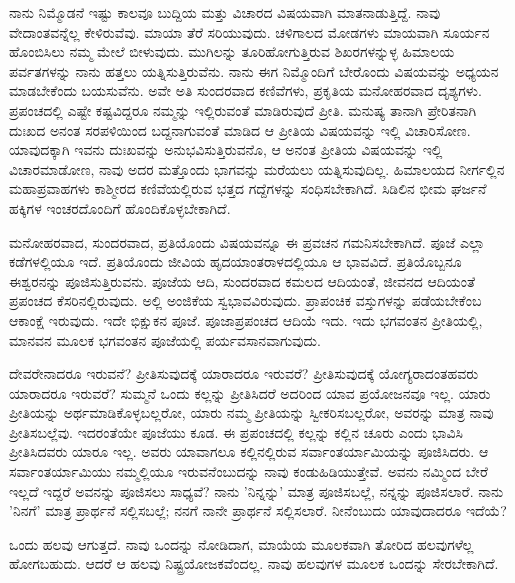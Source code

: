 ನಾನು ನಿಮ್ಮೊಡನೆ ಇಷ್ಟು ಕಾಲವೂ ಬುದ್ದಿಯ ಮತ್ತು ವಿಚಾರದ ವಿಷಯವಾಗಿ ಮಾತನಾಡುತ್ತಿದ್ದೆ. ನಾವು ವೇದಾಂತವನ್ನೆಲ್ಲ ಕೇಳಿರುವೆವು. ಮಾಯಾ ತೆರೆ ಸರಿಯುವುದು. ಚಳಿಗಾಲದ ಮೋಡಗಳು ಮಾಯವಾಗಿ ಸೂರ್ಯನ ಹೊಂಬಿಸಿಲು ನಮ್ಮ ಮೇಲೆ ಬೀಳುವುದು. ಮುಗಿಲನ್ನು ತೂರಿಹೋಗುತ್ತಿರುವ ಶಿಖರಗಳನ್ನುಳ್ಳ ಹಿಮಾಲಯ ಪರ್ವತಗಳನ್ನು ನಾನು ಹತ್ತಲು ಯತ್ನಿಸುತ್ತಿರುವೆನು. ನಾನು ಈಗ ನಿಮ್ಮೊಂದಿಗೆ ಬೇರೊಂದು ವಿಷಯವನ್ನು ಅಧ್ಯಯನ ಮಾಡಬೇಕೆಂದು ಬಯಸುವೆನು. ಅವೇ ಅತಿ ಸುಂದರವಾದ ಕಣಿವೆಗಳು, ಪ್ರಕೃತಿಯ ಮನೋಹರವಾದ ದೃಶ್ಯಗಳು. ಪ್ರಪಂಚದಲ್ಲಿ ಎಷ್ಟೇ ಕಷ್ಟವಿದ್ದರೂ ನಮ್ಮನ್ನು ಇಲ್ಲಿರುವಂತೆ ಮಾಡಿರುವುದೆ ಪ್ರೀತಿ. ಮನುಷ್ಯ ತಾನಾಗಿ ಪ್ರೇರಿತನಾಗಿ ದುಃಖದ ಅನಂತ ಸರಪಳಿಯಿಂದ ಬದ್ದನಾಗುವಂತೆ ಮಾಡಿದ ಆ ಪ್ರೀತಿಯ ವಿಷಯವನ್ನು ಇಲ್ಲಿ ವಿಚಾರಿಸೋಣ. ಯಾವುದಕ್ಕಾಗಿ ಇವನು ದುಃಖವನ್ನು ಅನುಭವಿಸುತ್ತಿರುವನೊ, ಆ ಅನಂತ ಪ್ರೀತಿಯ ವಿಷಯವನ್ನು ಇಲ್ಲಿ ವಿಚಾರಮಾಡೋಣ, ನಾವು ಅದರ ಮತ್ತೊಂದು ಭಾಗವನ್ನು ಮರೆಯಲು ಯತ್ನಿಸುವುದಿಲ್ಲ. ಹಿಮಾಲಯದ ನೀರ್ಗಲ್ಲಿನ ಮಹಾಪ್ರವಾಹಗಳು ಕಾಶ್ಮೀರದ ಕಣಿವೆಯಲ್ಲಿರುವ ಭತ್ತದ ಗದ್ದೆಗಳನ್ನು ಸಂಧಿಸಬೇಕಾಗಿದೆ. ಸಿಡಿಲಿನ ಭೀಮ ಘರ್ಜನೆ ಹಕ್ಕಿಗಳ ಇಂಚರದೊಂದಿಗೆ ಹೊಂದಿಕೊಳ್ಳಬೇಕಾಗಿದೆ.

ಮನೋಹರವಾದ, ಸುಂದರವಾದ, ಪ್ರತಿಯೊಂದು ವಿಷಯವನ್ನೂ ಈ ಪ್ರವಚನ ಗಮನಿಸಬೇಕಾಗಿದೆ. ಪೂಜೆ ಎಲ್ಲಾ ಕಡೆಗಳಲ್ಲಿಯೂ ಇದೆ. ಪ್ರತಿಯೊಂದು ಜೀವಿಯ ಹೃದಯಾಂತರಾಳದಲ್ಲಿಯೂ ಆ ಭಾವವಿದೆ. ಪ್ರತಿಯೊಬ್ಬನೂ ಈಶ್ವರನನ್ನು ಪೂಜಿಸುತ್ತಿರುವನು. ಪೂಜೆಯ ಆದಿ, ಸುಂದರವಾದ ಕಮಲದ ಆದಿಯಂತೆ, ಜೀವನದ ಆದಿಯಂತೆ ಪ್ರಪಂಚದ ಕೆಸರಿನಲ್ಲಿರುವುದು. ಅಲ್ಲಿ ಅಂಜಿಕೆಯ ಸ್ವಭಾವವಿರುವುದು. ಪ್ರಾಪಂಚಿಕ ವಸ್ತುಗಳನ್ನು ಪಡೆಯಬೇಕೆಂಬ ಆಕಾಂಕ್ಷೆ ಇರುವುದು. ಇದೇ ಭಿಕ್ಷುಕನ ಪೂಜೆ. ಪೂಜಾಪ್ರಪಂಚದ ಆದಿಯೆ ಇದು. ಇದು ಭಗವಂತನ ಪ್ರೀತಿಯಲ್ಲಿ, ಮಾನವನ ಮೂಲಕ ಭಗವಂತನ ಪೂಜೆಯಲ್ಲಿ ಪರ್ಯವಸಾನವಾಗುವುದು.

ದೇವರೇನಾದರೂ ಇರುವನೆ? ಪ್ರೀತಿಸುವುದಕ್ಕೆ ಯಾರಾದರೂ ಇರುವರೆ? ಪ್ರೀತಿಸುವುದಕ್ಕೆ ಯೋಗ್ಯರಾದಂತಹವರು ಯಾರಾದರೂ ಇರುವರೆ? ಸುಮ್ಮನೆ ಒಂದು ಕಲ್ಲನ್ನು ಪ್ರೀತಿಸಿದರೆ ಅದರಿಂದ ಯಾವ ಪ್ರಯೋಜನವೂ ಇಲ್ಲ. ಯಾರು ಪ್ರೀತಿಯನ್ನು ಅರ್ಥಮಾಡಿಕೊಳ್ಳಬಲ್ಲರೋ, ಯಾರು ನಮ್ಮ ಪ್ರೀತಿಯನ್ನು ಸ್ವೀಕರಿಸಬಲ್ಲರೋ, ಅವರನ್ನು ಮಾತ್ರ ನಾವು ಪ್ರೀತಿಸಬಲ್ಲೆವು. ಇದರಂತೆಯೇ ಪೂಜೆಯು ಕೂಡ. ಈ ಪ್ರಪಂಚದಲ್ಲಿ ಕಲ್ಲನ್ನು ಕಲ್ಲಿನ ಚೂರು ಎಂದು ಭಾವಿಸಿ ಪ್ರೀತಿಸಿದವರು ಯಾರೂ ಇಲ್ಲ. ಅವರು ಯಾವಾಗಲೂ ಕಲ್ಲಿನಲ್ಲಿರುವ ಸರ್ವಾಂತರ್ಯಾಮಿಯನ್ನು ಪೂಜಿಸಿದರು. ಆ ಸರ್ವಾಂತರ್ಯಾಮಿಯು ನಮ್ಮಲ್ಲಿಯೂ ಇರುವನೆಂಬುದನ್ನು ನಾವು ಕಂಡುಹಿಡಿಯುತ್ತೇವೆ. ಅವನು ನಮ್ಮಿಂದ ಬೇರೆ ಇಲ್ಲದೆ ಇದ್ದರೆ ಅವನನ್ನು ಪೂಜಿಸಲು ಸಾಧ್ಯವೆ? ನಾನು 'ನಿನ್ನನ್ನು' ಮಾತ್ರ ಪೂಜಿಸಬಲ್ಲೆ, ನನ್ನನ್ನು ಪೂಜಿಸಲಾರೆ. ನಾನು 'ನಿನಗೆ' ಮಾತ್ರ ಪ್ರಾರ್ಥನೆ ಸಲ್ಲಿಸಬಲ್ಲೆ; ನನಗೆ ನಾನೇ ಪ್ರಾರ್ಥನೆ ಸಲ್ಲಿಸಲಾರೆ. ನೀನೆಂಬುದು ಯಾವುದಾದರೂ ಇದೆಯೆ?

ಒಂದು ಹಲವು ಆಗುತ್ತದೆ. ನಾವು ಒಂದನ್ನು ನೋಡಿದಾಗ, ಮಾಯೆಯ ಮೂಲಕವಾಗಿ ತೋರಿದ ಹಲವುಗಳೆಲ್ಲ ಹೋಗಬಹುದು. ಆದರೆ ಆ ಹಲವು ನಿಷ್ಟ್ರಯೋಜಕವೆಂದಲ್ಲ. ನಾವು ಹಲವುಗಳ ಮೂಲಕ ಒಂದನ್ನು ಸೇರಬೇಕಾಗಿದೆ.

